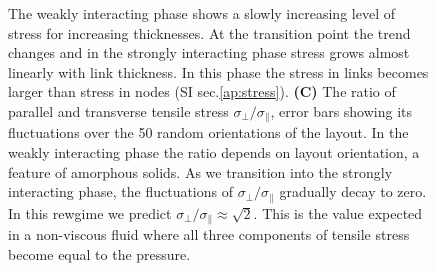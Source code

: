 \documentclass[nofootinbib,preprint,floatfix,titlepage,superscriptaddress]{revtex4} %
\begin{document}
\begin{figure}
{    %
    The weakly interacting phase shows a slowly increasing level of stress for increasing thicknesses. %
    At the transition point the trend changes and in the strongly interacting phase stress grows almost linearly with link thickness. 
    In this phase the stress in links becomes larger than stress in nodes (SI sec.\ref{ap:stress}). 
    {\bf (C)} The ratio of parallel and transverse tensile stress $\sigma_\perp/\sigma_\parallel$, error bars showing its fluctuations over the 50 random orientations of the layout. 
    In the weakly interacting phase the ratio depends on layout orientation,
    a feature of amorphous solids.
    As we transition into the strongly interacting phase, the fluctuations of $\sigma_\perp/\sigma_\parallel$ gradually decay to zero. 
    In this rewgime we predict $\sigma_\perp/\sigma_\parallel \approx \sqrt{2}$. 
    This is the value expected in a non-viscous fluid where all three components of tensile stress become equal to the pressure.}
    \label{fig:stress}
\end{figure}
\end{document}
